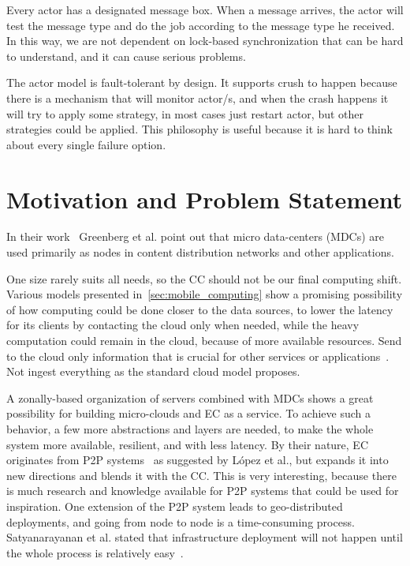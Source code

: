 Every actor has a designated message box. When a message arrives, the actor will test the message type and do the job according to the message type he received. In this way, we are not dependent on lock-based synchronization that can be hard to understand, and it can cause serious problems.

The actor model is fault-tolerant by design. It supports crush to happen because there is a  mechanism that will monitor actor/s, and when the crash happens it will try to apply some strategy, in most cases just restart actor, but other strategies could be applied. This philosophy is useful because it is hard to think about every single failure option.
%
%
\section{Motivation and Problem Statement}\label{sec:problem_statement}
%
In their work~\cite{GreenbergHMP09} Greenberg et al. point out that micro data-centers (MDCs) are used primarily as nodes in content distribution networks and other  applications.

One size rarely suits all needs, so the CC should not be our final computing shift. Various models presented in~\ref{sec:mobile_computing} show a promising possibility of how computing could be done closer to the data sources, to lower the latency for its clients by contacting the cloud only when needed, while the heavy computation could remain in the cloud, because of more available resources. Send to the cloud only information that is crucial for other services or applications~\cite{inproceedingsSimic1}. Not ingest everything as the standard cloud model proposes.

A zonally-based organization of servers combined with MDCs shows a great possibility for building micro-clouds and EC as a service. To achieve such a behavior, a few more abstractions and layers are needed, to make the whole system more available, resilient, and with less latency. By their nature, EC originates from P2P systems~\cite{LopezMEDHIBFR15} as suggested by L{\'{o}}pez et al., but expands it into new directions and blends it with the CC. This is very interesting, because there is much research and knowledge available for P2P systems that could be used for inspiration. One extension of the P2P system leads to geo-distributed deployments, and going from node to node is a time-consuming process. Satyanarayanan et al. stated that infrastructure deployment will not happen until the whole process is relatively easy~\cite{SatyanarayananBCD09}. 

